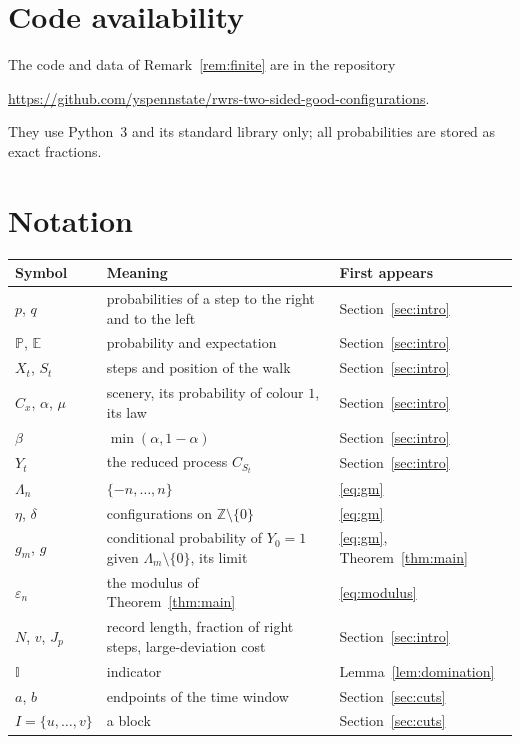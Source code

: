 \documentclass[11pt]{amsart}
\theoremstyle{remark}
\newcommand{\Z}{\mathbb{Z}}
\newcommand{\PP}{\mathbb{P}}
\newcommand{\E}{\mathbb{E}}
\newcommand{\I}{\mathbb{I}}
\begin{document}
\section*{Code availability}
The code and data of Remark~\ref{rem:finite} are in the repository
\begin{center}\url{https://github.com/yspennstate/rwrs-two-sided-good-configurations}.\end{center}
They use Python~3 and its standard library only; all probabilities are stored as exact fractions.

\appendix
\section{Notation}\label{app:notation}

\begin{center}
\begin{tabular}{p{3.0cm}p{8.0cm}p{3.1cm}}
\toprule
Symbol & Meaning & First appears\\
\midrule
$p$, $q$ & probabilities of a step to the right and to the left & Section~\ref{sec:intro}\\
$\PP$, $\E$ & probability and expectation & Section~\ref{sec:intro}\\
$X_t$, $S_t$ & steps and position of the walk & Section~\ref{sec:intro}\\
$C_x$, $\alpha$, $\mu$ & scenery, its probability of colour $1$, its law & Section~\ref{sec:intro}\\
$\beta$ & $\min(\alpha,1-\alpha)$ & Section~\ref{sec:intro}\\
$Y_t$ & the reduced process $C_{S_t}$ & Section~\ref{sec:intro}\\
$\Lambda_n$ & $\{-n,\dots,n\}$ & \eqref{eq:gm}\\
$\eta$, $\delta$ & configurations on $\Z\setminus\{0\}$ & \eqref{eq:gm}\\
$g_m$, $g$ & conditional probability of $Y_0=1$ given $\Lambda_m\setminus\{0\}$, its limit & \eqref{eq:gm},
Theorem~\ref{thm:main}\\
$\varepsilon_n$ & the modulus of Theorem~\ref{thm:main} & \eqref{eq:modulus}\\
$N$, $v$, $J_p$ & record length, fraction of right steps, large-deviation cost & Section~\ref{sec:intro}\\
$\I$ & indicator & Lemma~\ref{lem:domination}\\
$a$, $b$ & endpoints of the time window & Section~\ref{sec:cuts}\\
$I=\{u,\dots,v\}$ & a block & Section~\ref{sec:cuts}\\

\end{tabular}
\end{center}
\end{document}
